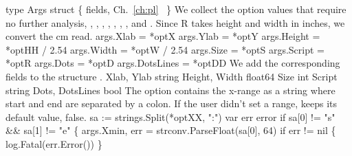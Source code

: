 type Args struct \{
          \LA{} fields, Ch.~\ref{ch:pl}~{\nwtagstyle{}}\RA{}
\}
\nwendcode{}\nwdocspar
We collect the option values that require no further analysis,
, , , , , , , and
. Since R takes height and width in inches, we convert the cm
read.
\nwenddocs{}\endmoddef\nwstartdeflinemarkup{}\nwenddeflinemarkup
args.Xlab = *optX
args.Ylab = *optY
args.Height = *optHH / 2.54
args.Width = *optW / 2.54
args.Size = *optS
args.Script = *optR
args.Dots = *optD
args.DotsLines = *optDD
\nwendcode{}\nwdocspar
We add the corresponding fields to the structure .
\nwenddocs{}\endmoddef\nwstartdeflinemarkup{}\nwenddeflinemarkup
Xlab, Ylab string
Height, Width float64
Size int
Script string
Dots, DotsLines bool
\nwendcode{}\nwdocspar
The  option contains the x-range as a string where start and
end are separated by a colon. If the user didn't set a range,
 keeps its default value, false.
\nwenddocs{}\endmoddef\nwstartdeflinemarkup{}\nwenddeflinemarkup
sa := strings.Split(*optXX, ":")
var err error
if sa[0] != "s" && sa[1] != "e" \{
          args.Xmin, err = strconv.ParseFloat(sa[0], 64)
          if err != nil \{ log.Fatal(err.Error()) \}
